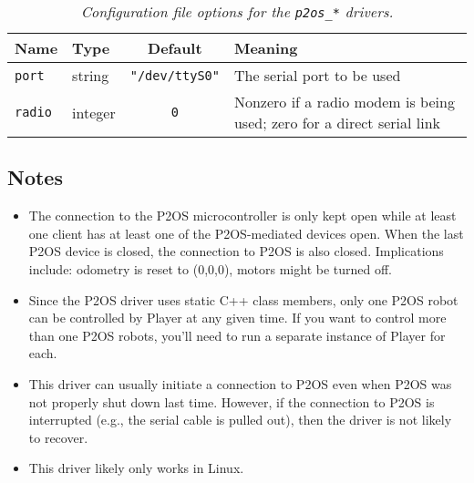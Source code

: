 \begin{table}[ht]
\begin{center}
{\small \begin{tabular}{|l|l|c|l|}
\hline
Name & Type & Default & Meaning\\
\hline
{\tt port} & string & {\tt "/dev/ttyS0"} & The serial port to be used\\
\hline
{\tt radio} & integer & {\tt 0} & Nonzero if a radio modem is being used; 
zero for a direct serial link\\
\hline
\end{tabular}}
\end{center}
\caption{{\em Configuration file options for the {\tt p2os\_*} drivers.}}
\label{table:p2os_options}
\end{table}

\subsection*{Notes}
\begin{itemize}
\item The connection to the P2OS microcontroller is only kept open while
at least one client has at least one of the P2OS-mediated devices open.
When the last P2OS device is closed, the connection to P2OS is also closed.
Implications include: odometry is reset to (0,0,0), motors might be turned off.
\item Since the P2OS driver uses static C++ class members, only one P2OS
robot can be controlled by Player at any given time.  If you want to control
more than one P2OS robots, you'll need to run a separate instance of Player
for each.
\item This driver can usually initiate a connection to P2OS even when P2OS was 
not properly shut down last time.  However, if the connection to P2OS is
interrupted (e.g., the serial cable is pulled out), then the driver is not
likely to recover.
\item This driver likely only works in Linux.
\end{itemize}
